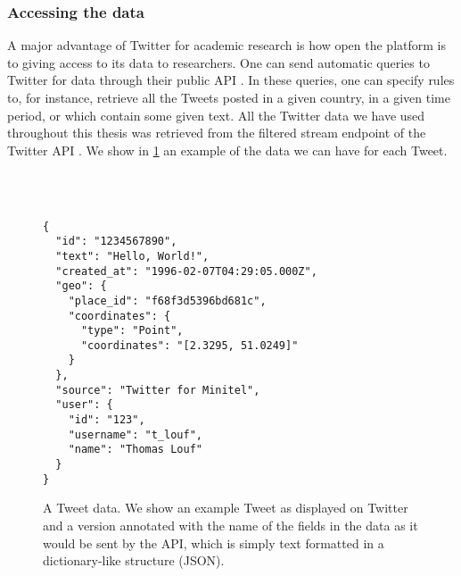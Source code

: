 \documentclass[../thesis.tex]{subfiles}
\begin{document}
\subsubsection{Accessing the data}
A major advantage of Twitter for academic research is how open the platform is to giving
access to its data to researchers. One can send automatic queries to Twitter for data
through their public \ac{API} \cite{TwitterAPI}. In these queries, one can specify rules
to, for instance, retrieve all the Tweets posted in a given country, in a given time
period, or which contain some given text. All the Twitter data we have used throughout
this thesis was retrieved from the filtered stream endpoint of the Twitter \ac{API}
\cite{TwitterAPIa}. We show in \cref{fig:tweet_data} an example of the data we can have
for each Tweet.

\captionsetup[subfigure]{position=top, labelfont=it,textfont=normalfont,singlelinecheck=off,justification=raggedright}
\begin{figure}
  \centering
  \\
  \\
  \begin{SubFloat}{\label{subfig:json}}
    \begin{minipage}[b]{0.95\linewidth}
        \begin{lstlisting}[frame=single,xleftmargin=5mm]
{
  "id": "1234567890",
  "text": "Hello, World!",
  "created_at": "1996-02-07T04:29:05.000Z",
  "geo": {
    "place_id": "f68f3d5396bd681c",
    "coordinates": {
      "type": "Point",
      "coordinates": "[2.3295, 51.0249]"
    }
  },
  "source": "Twitter for Minitel",
  "user": {
    "id": "123",
    "username": "t_louf",
    "name": "Thomas Louf"
  }
}
      \end{lstlisting}
    \end{minipage}
  \end{SubFloat}
  \caption[]{A Tweet data. We show  an example Tweet as displayed
  on Twitter and  a version annotated with the name of the
  fields in  the data as it would be sent by the \ac{API}, which is
  simply text formatted in a dictionary-like structure (JSON).}
  \label{fig:tweet_data}
\end{figure}
\end{document}
